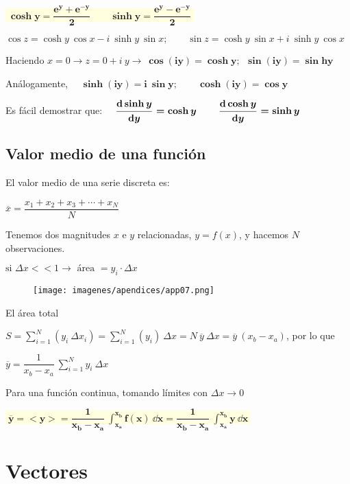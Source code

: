 \colorbox{LightYellow}{$\boxed{ \; \boldsymbol{ 
\cosh y=\dfrac {e^y+e^{-y}}{2} \qquad \sinh y=\dfrac {e^y-e^{-y}}{2} 
 } \; } $}

$\cos z = \cosh y \ \cos x - i \ \sinh y \ \sin x; \qquad 
 \sin z = \cosh y \ \sin x + i \ \sinh y \ \cos x$
 
 Haciendo $x=0 \to z=0+i \ y \to \ \boldsymbol{\cos(iy)=\cosh y;\  \ \sin(iy)=\sin h y}$

Análogamente, $\quad \boldsymbol{\sinh (iy)=i\ \sin y; \qquad \cosh(iy)=\cos y}$

Es fácil demostrar que: $\displaystyle \quad \boldsymbol{\dv{\sinh y}{y}=\cosh y\; \qquad \dv{\cosh y}{y}=\sinh y}$

\vspace{20mm} %
\section{Valor medio de una función}

\begin{multicols}{2}
El valor medio de una serie discreta es:

$\overline{x}=\dfrac{x_1+x_2+x_3+\cdots+x_N}{N}$

Tenemos dos magnitudes $x$ e $y$ relacionadas, $y=f(x)$, y hacemos $N$ observaciones.

$\text{si } \Delta x<<1 \to \text{ área }= y_i\cdot \Delta x$
\begin{figure}[H]
\centering
\texttt{[image: imagenes/apendices/app07.png]}
\end{figure}	
\end{multicols}


El área total

$S=\displaystyle \sum_{i=1}^{N}(y_i\ \Delta x_i)=\sum_{i=1}^{N}(y_i)\ \Delta x=N \ \overline{y} \ \Delta x=\overline{y}\ (x_b-x_a)$, por lo que

$\overline{y}=\displaystyle \dfrac 1{x_b-x_a} \ \sum_{i=1}^N y_i\ \Delta x$

Para una función continua, tomando límites con $\Delta x\to 0$

\colorbox{LightYellow}{$\boxed{ \; \boldsymbol{ 
\overline{y}=<y>=\displaystyle \dfrac 1{x_b-x_a} \ \int_{x_a}^{x_b}f(x) \ \dd x = \dfrac 1{x_b-x_a} \ \int_{x_a}^{x_b} y \  \dd x
 } \; } $}




\chapter{Vectores}\label{Vectores}

